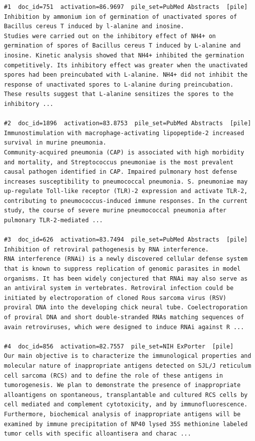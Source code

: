 \begin{verbatim}
#1  doc_id=751  activation=86.9697  pile_set=PubMed Abstracts  [pile]
Inhibition by ammonium ion of germination of unactivated spores of Bacillus cereus T induced by l-alanine and inosine.
Studies were carried out on the inhibitory effect of NH4+ on germination of spores of Bacillus cereus T induced by L-alanine and inosine. Kinetic analysis showed that NH4+ inhibited the germination competitively. Its inhibitory effect was greater when the unactivated spores had been preincubated with L-alanine. NH4+ did not inhibit the response of unactivated spores to L-alanine during preincubation. These results suggest that L-alanine sensitizes the spores to the inhibitory ...

#2  doc_id=1896  activation=83.8753  pile_set=PubMed Abstracts  [pile]
Immunostimulation with macrophage-activating lipopeptide-2 increased survival in murine pneumonia.
Community-acquired pneumonia (CAP) is associated with high morbidity and mortality, and Streptococcus pneumoniae is the most prevalent causal pathogen identified in CAP. Impaired pulmonary host defense increases susceptibility to pneumococcal pneumonia. S. pneumoniae may up-regulate Toll-like receptor (TLR)-2 expression and activate TLR-2, contributing to pneumococcus-induced immune responses. In the current study, the course of severe murine pneumococcal pneumonia after pulmonary TLR-2-mediated ...

#3  doc_id=626  activation=83.7494  pile_set=PubMed Abstracts  [pile]
Inhibition of retroviral pathogenesis by RNA interference.
RNA interference (RNAi) is a newly discovered cellular defense system that is known to suppress replication of genomic parasites in model organisms. It has been widely conjectured that RNAi may also serve as an antiviral system in vertebrates. Retroviral infection could be initiated by electroporation of cloned Rous sarcoma virus (RSV) proviral DNA into the developing chick neural tube. Coelectroporation of proviral DNA and short double-stranded RNAs matching sequences of avain retroviruses, which were designed to induce RNAi against R ...

#4  doc_id=856  activation=82.7557  pile_set=NIH ExPorter  [pile]
Our main objective is to characterize the immunological properties and molecular nature of inappropriate antigens detected on SJL/J reticulum cell sarcoma (RCS) and to define the role of these antigens in tumorogenesis. We plan to demonstrate the presence of inappropriate alloantigens on spontaneous, transplantable and cultured RCS cells by cell mediated and complement cytotoxicity, and by immunofluorescence. Furthermore, biochemical analysis of inappropriate antigens will be examined by immune precipitation of NP40 lysed 35S methionine labeled tumor cells with specific alloantisera and charac ...


\end{verbatim}
